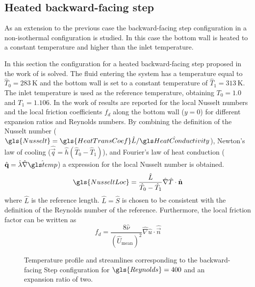 
\subsection{Heated backward-facing step}\label{ssec:HeatedBackwardFacingStep}


As an extension to the previous case the backward-facing step configuration in a non-isothermal configuration is studied. In this case the bottom wall is heated to a constant temperature and higher than the inlet temperature.

In this section the configuration for a heated backward-facing step proposed in the work of \textcite{xieFluidFlowHeat2016} is solved. 
The fluid entering the system has a temperature equal to $\hat T_0 = \SI{283}{\kelvin}$ and the bottom wall is set to a constant temperature of $\hat T_1 =\SI{313}{\kelvin}$. The inlet temperature is used as the reference temperature, obtaining $T_0 = 1.0$ and $T_1 = 1.106$.
In the work of \textcite{xieFluidFlowHeat2016} results are reported for the local Nusselt numbers and the local friction coefficients $f_d$  along the bottom wall ($y = 0$) for different expansion ratios and Reynolds numbers.
By combining the definition of the Nusselt number ($\gls{Nusselt} = \gls{HeatTransCoef}\hat{L}/\glsHat{HeatConductivity}$), Newton's law of cooling ($\hat{\vec{q}} = \hat{h} (\hat{T}_0 - \hat{T}_1 )$), and Fourier's law of heat conduction ($\hat{\vec{q}} = \hat \lambda \hat{\nabla} \glsHat{temp}$) a expression for the local Nusselt number is obtained.
\begin{equation}
	\gls{NusseltLoc} = \frac{\hat L}{\hat T_0-\hat T_1}\hat \nabla \hat T \cdot \hat {\vec{n}}
\end{equation}
where $\hat L$ is the reference length. $ \hat L = \hat S$ is chosen to be consistent with the definition of the Reynolds number of the reference. Furthermore, the local friction factor can be written as %
\begin{equation}
	f_d = \frac{8\hat \nu} { (\hat U_{\text{mean}})^2}  \hat \nabla \hat u \cdot \hat {\vec{n}}
\end{equation}

\begin{figure}[t]
	\centering
	\pgfplotsset{width=0.81\textwidth, compat=1.3}
	\caption{Temperature profile and streamlines corresponding to the backward-facing Step configuration for $\gls{Reynolds} = 400$ and an expansion ratio of two.} \label{fig:BFS_Temperature_Streamlines}
\end{figure}

